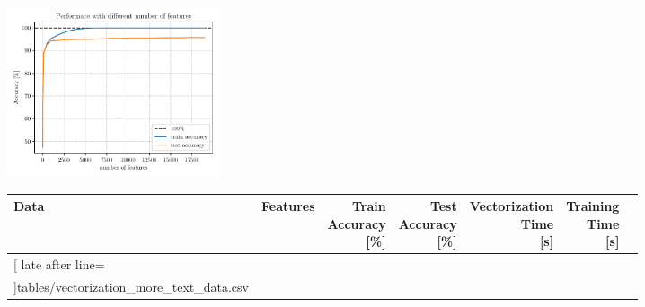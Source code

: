 \documentclass[10pt]{article}
\begin{document}
	\begin{figure}[htbp]
		\centering
		\begin{minipage}[t]{0.48\textwidth}
			\centering
			\vspace{0pt} %
			\includegraphics[height=5cm]{figures/vectorization_comparison_feature_number_impact.pdf}
			\subcaption{}
	
		\end{minipage}
		\hfill
		\begin{minipage}[t]{0.48\textwidth}
			\centering
			\vspace{5pt} %
			
			\small
			\setlength{\tabcolsep}{4pt}
			\renewcommand{\arraystretch}{1.1}
			\begin{adjustbox}{scale=.8, valign=t}
				\begin{tabular}{|l|l|r|r|r|r|r|}
					\hline
					\rowcolor{gray!30}
					\bfseries Data & 
					\bfseries Features & 
					\bfseries \makecell{Train\\Accuracy\\{\footnotesize[\%]}} & 
					\bfseries \makecell{Test\\Accuracy\\{\footnotesize[\%]}} & 
					\bfseries \makecell{Vectorization\\Time\\{\footnotesize[s]}} & 
					\bfseries \makecell{Training\\Time\\{\footnotesize[s]}} \\
					\hline
					\csvreader[
					late after line=\\\hline
					]{tables/vectorization_more_text_data.csv}{}%
					{\csvcoli  & \csvcoliii & \csvcoliv & \csvcolv & \csvcolvi & \csvcolvii}%
				\end{tabular}
			\end{adjustbox}
			\subcaption{}


\end{minipage}
\end{figure}
\end{document}
